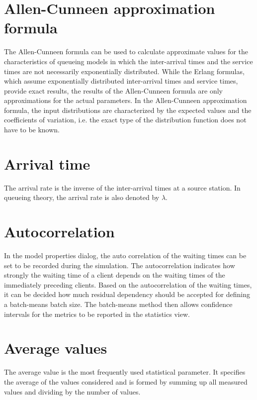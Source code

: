 
\section*{Allen-Cunneen approximation formula}


The Allen-Cunneen formula can be used to calculate approximate values for the characteristics of
queueing models in which the inter-arrival times and the service times are not necessarily
exponentially distributed. While the Erlang formulas, which assume exponentially distributed
inter-arrival times and service times, provide exact results, the results of the Allen-Cunneen formula
are only approximations for the actual parameters. In the Allen-Cunneen approximation formula,
the input distributions are characterized by the expected values and the coefficients of variation,
i.e. the exact type of the distribution function does not have to be known.

\section*{Arrival time}


The arrival rate is the inverse of the inter-arrival times at a source station.
In queueing theory, the arrival rate is also denoted by $\lambda$.

\section*{Autocorrelation}


In the model properties dialog, the auto correlation of the waiting times can be set to be recorded
during the simulation. The autocorrelation indicates how strongly the waiting time of a client depends on the waiting times of the
immediately preceding clients. Based on the autocorrelation of the waiting times, it can be decided how much residual dependency should
be accepted for defining a batch-means batch size. The batch-means method then allows confidence intervals for the metrics to be reported
in the statistics view.

\section*{Average values}


The average value is the most frequently used statistical parameter.
It specifies the average of the values considered and is formed by
summing up all measured values and dividing by the number of values.

